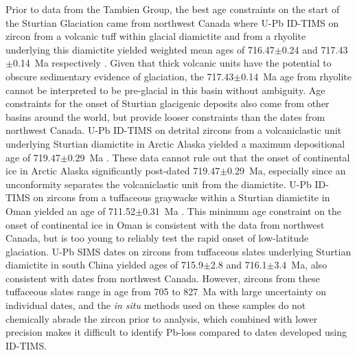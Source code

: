 \documentclass[11pt,letterpaper]{article}
\begin{document}
Prior to data from the Tambien Group, the best age constraints on the start of the Sturtian Glaciation came from northwest Canada where U-Pb ID-TIMS on zircon from a volcanic tuff within glacial diamictite and from a rhyolite underlying this diamictite yielded weighted mean ages of 716.47$\pm$0.24 and 717.43$\pm$0.14~Ma respectively \citep{Macdonald2010a}. Given that thick volcanic units have the potential to obscure sedimentary evidence of glaciation, the 717.43$\pm$0.14~Ma age from rhyolite cannot be interpreted to be pre-glacial in this basin without ambiguity. Age constraints for the onset of Sturtian glacigenic deposits also come from other basins around the world, but provide looser constraints than the dates from northwest Canada. U-Pb ID-TIMS on detrital zircons from a volcaniclastic unit underlying Sturtian diamictite in Arctic Alaska yielded a maximum depositional age of 719.47$\pm$0.29~Ma \citep{Cox2015a}. These data cannot rule out that the onset of continental ice in Arctic Alaska significantly post-dated 719.47$\pm$0.29~Ma, especially since an unconformity separates the volcaniclastic unit from the diamictite. U-Pb ID-TIMS on zircons from a tuffaceous graywacke within a Sturtian diamictite in Oman yielded an age of 711.52$\pm$0.31~Ma \citep{Brasier2000a, Bowring2007a}. This minimum age constraint on the onset of continental ice in Oman is consistent with the data from northwest Canada, but is too young to reliably test the rapid onset of low-latitude glaciation. U-Pb SIMS dates on zircons from tuffaceous slates underlying Sturtian diamictite in south China yielded ages of 715.9$\pm$2.8 and 716.1$\pm$3.4~Ma, also consistent with dates from northwest Canada. However, zircons from these tuffaceous slates range in age from 705 to 827~Ma \citep{Lan2014a} with large uncertainty on individual dates, and the \textit{in situ} methods used on these samples do not chemically abrade the zircon prior to analysis, which combined with lower precision makes it difficult to identify Pb-loss compared to dates developed using ID-TIMS.
\end{document}

